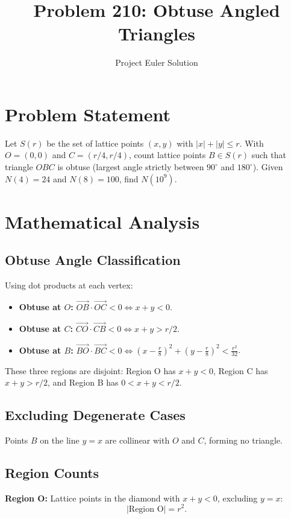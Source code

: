 \documentclass[12pt]{article}
\title{Problem 210: Obtuse Angled Triangles}
\author{Project Euler Solution}
\date{}
\begin{document}
\maketitle

\section{Problem Statement}
Let $S(r)$ be the set of lattice points $(x,y)$ with $|x|+|y| \leq r$. With $O = (0,0)$ and $C = (r/4, r/4)$, count lattice points $B \in S(r)$ such that triangle $OBC$ is obtuse (largest angle strictly between $90^\circ$ and $180^\circ$). Given $N(4)=24$ and $N(8)=100$, find $N(10^9)$.

\section{Mathematical Analysis}

\subsection{Obtuse Angle Classification}
Using dot products at each vertex:

\begin{itemize}
    \item \textbf{Obtuse at $O$:} $\vec{OB} \cdot \vec{OC} < 0 \Leftrightarrow x + y < 0$.
    \item \textbf{Obtuse at $C$:} $\vec{CO} \cdot \vec{CB} < 0 \Leftrightarrow x + y > r/2$.
    \item \textbf{Obtuse at $B$:} $\vec{BO} \cdot \vec{BC} < 0 \Leftrightarrow \left(x - \frac{r}{8}\right)^2 + \left(y - \frac{r}{8}\right)^2 < \frac{r^2}{32}$.
\end{itemize}

These three regions are disjoint: Region O has $x+y<0$, Region C has $x+y>r/2$, and Region B has $0 < x+y < r/2$.

\subsection{Excluding Degenerate Cases}
Points $B$ on the line $y = x$ are collinear with $O$ and $C$, forming no triangle.

\subsection{Region Counts}

\textbf{Region O:} Lattice points in the diamond with $x+y < 0$, excluding $y = x$:
\[
|\text{Region O}| = r^2.
\]
\end{document}
